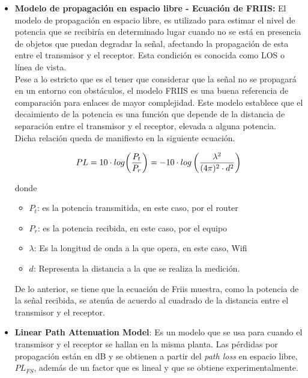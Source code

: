 \begin{itemize}
\item{\textbf{Modelo de propagación en espacio libre - Ecuación de FRIIS:} El modelo de propagación en espacio libre, es utilizado para estimar el nivel de potencia que se recibiría en determinado lugar cuando no se está en presencia de objetos que puedan degradar la señal, afectando la propagación de esta entre el transmisor y el receptor. Esta condición es conocida como \ac{LOS} o línea de vista.\\

Pese a lo estricto que es el tener que considerar que la señal no se propagará en un entorno con obstáculos, el modelo FRIIS es una buena referencia de comparación para enlaces de mayor complejidad. Este modelo establece que el decaimiento de la potencia es una función que depende de la distancia de separación entre el transmisor y el receptor, elevada a alguna potencia.\\

Dicha relación queda de manifiesto en la siguiente ecuación.

\begin{equation}
PL = 10\cdot{log{\left(\dfrac{P_t}{P_r}\right)}} = -10\cdot{log\left(\dfrac{\lambda^2}{(4\pi)^2\cdot{d^2}}\right)}\\
\end{equation}

donde\\

\begin{itemize}
\item{$P_t$: es la potencia transmitida, en este caso, por el router}
\item{$P_r$: es la potencia recibida, en este caso, por el equipo}
\item{$\lambda$: Es la longitud de onda a la que opera, en este caso, Wifi}
\item{$d$: Representa la distancia a la que se realiza la medición.}
\end{itemize}

De lo anterior, se tiene que la ecuación de Friis muestra, como la potencia de la señal recibida, se atenúa de acuerdo al cuadrado de la distancia entre el transmisor y el receptor. \\
}
\item{\textbf{Linear Path Attenuation Model}: Es un modelo que se usa para cuando el transmisor y el receptor se hallan en la misma planta. Las pérdidas por propagación están en dB y se obtienen a partir del \textit{path loss} en espacio libre, $PL_{FS}$, además de un factor que es lineal y que se obtiene experimentalmente.\\

}
\end{itemize}
